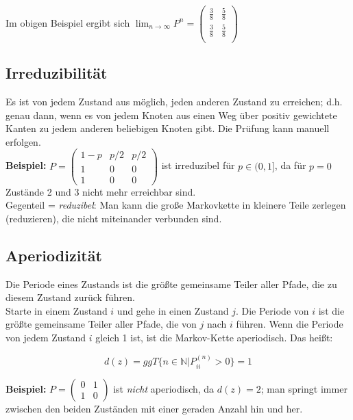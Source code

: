 Im obigen Beispiel ergibt sich \(\lim_{n\rightarrow\infty} P^n = \begin{pmatrix}
    \frac{3}{8} & \frac{5}{8}\\
    \frac{3}{8} & \frac{5}{8}\\
\end{pmatrix}\)


\subsection{Irreduzibilität}

Es ist von jedem Zustand aus möglich, jeden anderen Zustand zu erreichen; d.h. genau dann, wenn es von jedem Knoten aus einen Weg über positiv gewichtete Kanten zu jedem anderen beliebigen Knoten gibt.
Die Prüfung kann manuell erfolgen.\\

\textbf{Beispiel:}
\(
    P = \begin{pmatrix}
        1-p & p/2 & p/2\\
        1 & 0 & 0\\
        1 & 0 & 0
    \end{pmatrix}
\) ist irreduzibel für \(p\in (0,1]\), da für \(p=0\) Zustände 2 und 3 nicht mehr erreichbar sind.\\

Gegenteil = \emph{reduzibel}: Man kann die große Markovkette in kleinere Teile zerlegen (reduzieren), die nicht miteinander verbunden sind.\\

\subsection{Aperiodizität}

Die Periode eines Zustands ist die größte gemeinsame Teiler aller Pfade, die zu diesem Zustand zurück führen.\\

Starte in einem Zustand \(i\) und gehe in einen Zustand \(j\). Die Periode von \(i\) ist die größte gemeinsame Teiler aller Pfade, die von \(j\) nach \(i\) führen.
Wenn die Periode von jedem Zustand \(i\) gleich 1 ist, ist die Markov-Kette aperiodisch. Das heißt:

\begin{equation*}
    d(z)=ggT\{n \in \mathbb{N} | P_{ii}^{(n)} > 0\} = 1
\end{equation*}

\textbf{Beispiel:}
\(
    P = \begin{pmatrix}
        0 & 1\\
        1 & 0
    \end{pmatrix}
\) ist \emph{nicht} aperiodisch, da \(d(z) = 2\); man springt immer zwischen den beiden Zuständen mit einer geraden Anzahl hin und her.\\

